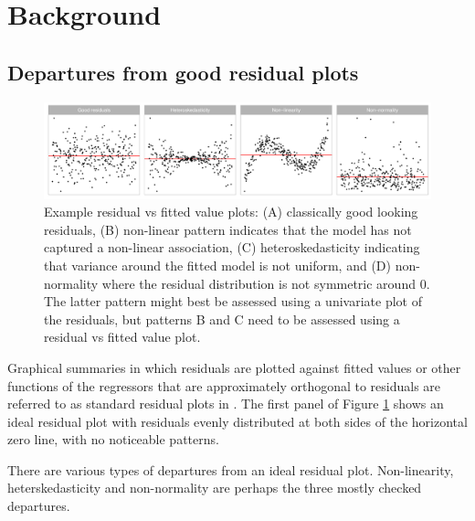 \documentclass[]{interact}
\theoremstyle{plain}%
\theoremstyle{definition}
\theoremstyle{remark}
\begin{document}
\hypertarget{background}{%
\section{Background}\label{background}}

\hypertarget{departures-from-good-residual-plots}{%
\subsection{Departures from good residual
plots}\label{departures-from-good-residual-plots}}

\begin{figure}

{\centering \includegraphics[width=1\linewidth]{paper_comparison_files/figure-latex/residual-plot-common-departures-1} 

}

\caption{Example residual vs fitted value plots: (A) classically good looking residuals, (B) non-linear pattern indicates that the model has not captured a non-linear association, (C) heteroskedasticity indicating that variance around the fitted model is not uniform, and (D) non-normality where the residual distribution is not symmetric around 0. The latter pattern might best be assessed using a univariate plot of the residuals, but patterns B and C need to be assessed using a residual vs fitted value plot.}\label{fig:residual-plot-common-departures}
\end{figure}

Graphical summaries in which residuals are plotted against fitted values
or other functions of the regressors that are approximately orthogonal
to residuals are referred to as standard residual plots in
\citet{cook1982residuals}. The first panel of Figure
\ref{fig:residual-plot-common-departures} shows an ideal residual plot
with residuals evenly distributed at both sides of the horizontal zero
line, with no noticeable patterns.

There are various types of departures from an ideal residual plot.
Non-linearity, heterskedasticity and non-normality are perhaps the three
mostly checked departures.
\end{document}
